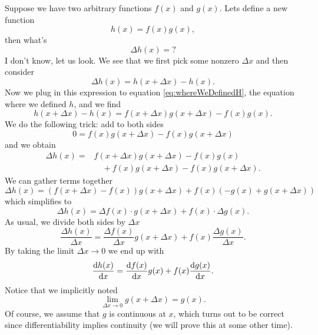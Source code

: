 Suppose we have two arbitrary functions $f(x)$ and $g(x)$. Lets
define a new function
\begin{equation}\label{eq:whereWeDefinedH}
h(x)=f(x)g(x),
\end{equation}
then what's 
\begin{equation}
\Delta h(x)=?
\end{equation}
I don't know, let us look. We see that we first pick some nonzero
$\Delta x$ and then consider
\begin{equation}
\Delta h(x)=h(x+\Delta x)-h(x).
\end{equation}
Now we plug in this expression to equation
\eqref{eq:whereWeDefinedH}, the equation where we defined $h$,
and we find
\begin{equation}
h(x+\Delta x)-h(x)=f(x+\Delta x)g(x+\Delta x)-f(x)g(x).
\end{equation}
We do the following trick: add to both sides
\begin{equation}
0=f(x)g(x+\Delta x)-f(x)g(x+\Delta x)
\end{equation}
and we obtain
\begin{equation}
\begin{split}
\Delta h(x)=&f(x+\Delta x)g(x+\Delta x)-f(x)g(x) \\
&\quad+f(x)g(x+\Delta x)-f(x)g(x+\Delta x).
\end{split}
\end{equation}
We can gather terms together
\begin{equation}
\Delta h(x)=(f(x+\Delta x)-f(x))g(x+\Delta
x)+f(x)(-g(x)+g(x+\Delta x))
\end{equation}
which simplifies to
\begin{equation}
\Delta h(x)=\Delta f(x)\cdot g(x+\Delta x)+f(x)\cdot\Delta g(x).
\end{equation}
As usual, we divide both sides by $\Delta x$
\begin{equation}
\frac{\Delta h(x)}{\Delta x}=\frac{\Delta f(x)}{\Delta x}g(x+\Delta x)
+f(x)\frac{\Delta g(x)}{\Delta x}.
\end{equation}
By taking the limit $\Delta x\to 0$ we end up with
\begin{equation}
\frac{\mathrm{d} h(x)}{\mathrm{d} x}=\frac{\mathrm{d} f(x)}{\mathrm{d} x}g(x)+f(x)\frac{\mathrm{d} g(x)}{\mathrm{d} x}.
\end{equation}
Notice that we implicitly noted
\begin{equation}
\lim_{\Delta x\to 0}g(x+\Delta x)=g(x).
\end{equation}
Of course, we assume that $g$ is continuous at $x$, which turns
out to be correct since differentiability implies continuity (we
will prove this at some other time).

